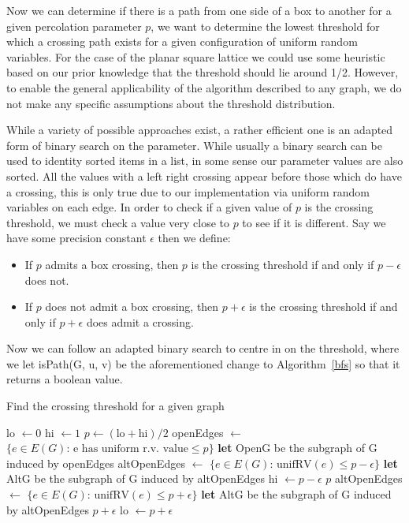 \documentclass[a4paper,11pt]{article}
\theoremstyle{definition}
\begin{document}
Now we can determine if there is a path from one side of a box to another for a given percolation parameter $p$, we want to determine the lowest threshold for which a crossing path exists for a given configuration of uniform random variables. For the case of the planar square lattice we could use some heuristic based on our prior knowledge that the threshold should lie around 1/2. However, to enable the general applicability of the algorithm described to any graph, we do not make any specific assumptions about the threshold distribution.

While a variety of possible approaches exist, a rather efficient one is an adapted form of binary search on the parameter. While usually a binary search can be used to identity sorted items in a list, in some sense our parameter values are also sorted. All the values with a left right crossing appear before those which do have a crossing, this is only true due to our implementation via uniform random variables on each edge.
In order to check if a given value of $p$ is the crossing threshold, we must check a value very close to $p$ to see if it is different. Say we have some precision constant $\epsilon$ then we define:
\begin{itemize}
	\item If $p$ admits a box crossing, then $p$ is the crossing threshold if and only if $p-\epsilon$ does not.
	\item If $p$ does not admit a box crossing, then $p+\epsilon$ is the crossing threshold if and only if $p+\epsilon$ does admit a crossing.
\end{itemize}

Now we can follow an adapted binary search to centre in on the threshold, where we let isPath(G, u, v) be the aforementioned change to Algorithm~\ref*{bfs} so that it returns a boolean value.

\begin{algorithm}
	\caption{Find the crossing threshold for a given graph}\label{findthreshold}
	\begin{algorithmic}[1]
	 
	\State lo $\gets 0$
	\State hi $\gets 1$
		\State $p \gets (\text{lo}+\text{hi})/2$
		\State openEdges $\gets$ $\{e \in E(G)\text{: e has uniform r.v. value}\leq p\}$
		\State \textbf{let} OpenG be the subgraph of G induced by openEdges
			\State altOpenEdges $\gets$ $\{e \in E(G)\text{: unifRV}(e)\leq p-\epsilon\}$
			\State \textbf{let} AltG be the subgraph of G induced by altOpenEdges
				\State hi $\gets p - \epsilon$
			\Else
				\State \Return $p$
			\EndIf
		\Else
			\State altOpenEdges $\gets$ $\{e \in E(G)\text{: unifRV}(e)\leq p+\epsilon\}$
			\State \textbf{let} AltG be the subgraph of G induced by altOpenEdges
				\State \Return $p +\epsilon$
			\Else
			\State lo $\gets p+\epsilon$
			\EndIf
		\EndIf
	\EndWhile
	\EndProcedure
	\end{algorithmic}
\end{algorithm}
\end{document}
